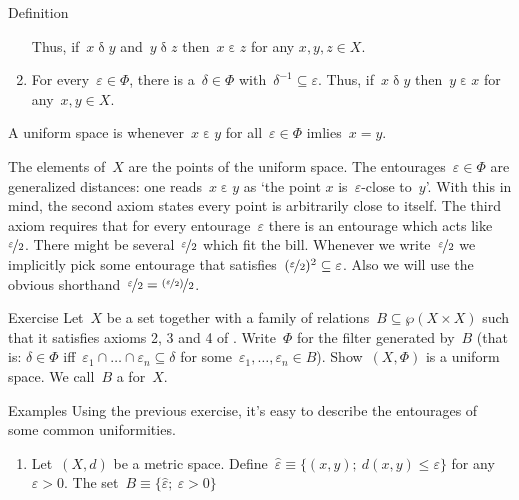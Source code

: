 \documentclass[b]{subfiles}
\begin{document}
\begin{parsec}
\begin{point}{Definition}
\begin{enumerate}
        Thus, if~$x \mathrel\delta y$ and~$y \mathrel\delta z$
            then~$x \mathrel\varepsilon z$ for any $x,y,z \in X$.
    \item
        For every~$\varepsilon \in \Phi$,
            there is a~$\delta \in \Phi$
                with~$\delta^{-1}\subseteq \varepsilon$.
        Thus, if~$x \mathrel\delta y$ then~$y \mathrel\varepsilon x$
            for any~$x,y \in X$.
    \end{enumerate}
    A uniform space is 
        whenever~$x \mathrel\varepsilon y$
            for all~$\varepsilon \in \Phi$
            imlies~$x=y$.
\begin{point}%
The elements of~$X$ are the points of the uniform space.
The entourages~$\varepsilon \in \Phi$
    are generalized distances:
one reads~$x \mathrel\varepsilon y$ as
    `the point $x$ is~$\varepsilon$-close to~$y$'.
With this in mind, the second axiom states every point is arbitrarily close
    to itself.
The third axiom requires that for every entourage~$\varepsilon$
    there is an entourage which acts like~$\nicefrac{\varepsilon}{2}$.
There might be several~$\nicefrac{\varepsilon}{2}$
    which fit the bill.
Whenever we write~$\nicefrac{\varepsilon}{2}$
    we implicitly pick some entourage that
    satisfies~$(\nicefrac{\varepsilon}{2})^2 \subseteq \varepsilon$.
Also we will use the obvious shorthand~$\nicefrac{\varepsilon}{2}
=   \nicefrac{(\nicefrac{\varepsilon}{2})}{2}$.
\end{point}
\end{point}
\begin{point}{Exercise}%
Let~$X$ be a set together with
    a family of relations~$B \subseteq \wp (X \times X)$
    such that it satisfies axioms 2, 3 and 4
    of .
Write~$\Phi$ for the filter generated by~$B$
    (that is: $\delta \in \Phi$
        iff~$\varepsilon_1 \cap \ldots \cap \varepsilon_n \subseteq \delta$
            for some~$\varepsilon_1, \ldots, \varepsilon_n \in B$).
Show~$(X,\Phi)$ is a uniform space.
We call~$B$ a  for~$X$.
\end{point}
\begin{point}{Examples}%
Using the previous exercise, it's easy
to describe the entourages of some common uniformities.
    \begin{enumerate}
        \item
    Let~$(X,d)$ be a metric space.
Define~$\hat\varepsilon \equiv \{(x,y);\ d(x,y) \leq \varepsilon\}$
for any $\varepsilon > 0$.
The set~$B \equiv \{ \hat\varepsilon; \ \varepsilon > 0\}$

\end{enumerate}
\end{point}
\end{parsec}
\end{document}
